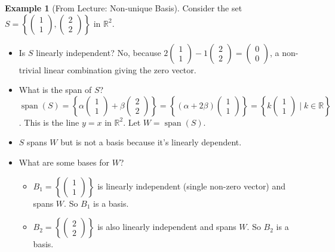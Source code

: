 \documentclass[11pt]{article}
\theoremstyle{definition}
\newtheorem{example}[theorem]{Example}
\theoremstyle{remark}
\newcommand{\R}{\mathbb{R}}
\newcommand{\Span}{\operatorname{span}}
\begin{document}
\begin{example}[From Lecture: Non-unique Basis]
Consider the set $S = \left\{ \begin{pmatrix} 1 \\ 1 \end{pmatrix}, \begin{pmatrix} 2 \\ 2 \end{pmatrix} \right\}$ in $\R^2$.
\begin{itemize}
    \item Is $S$ linearly independent? No, because $2 \begin{pmatrix} 1 \\ 1 \end{pmatrix} - 1 \begin{pmatrix} 2 \\ 2 \end{pmatrix} = \begin{pmatrix} 0 \\ 0 \end{pmatrix}$, a non-trivial linear combination giving the zero vector.
    \item What is the span of $S$? $\Span(S) = \left\{ \alpha \begin{pmatrix} 1 \\ 1 \end{pmatrix} + \beta \begin{pmatrix} 2 \\ 2 \end{pmatrix} \right\} = \left\{ (\alpha + 2\beta) \begin{pmatrix} 1 \\ 1 \end{pmatrix} \right\} = \left\{ k \begin{pmatrix} 1 \\ 1 \end{pmatrix} \mid k \in \R \right\}$. This is the line $y=x$ in $\R^2$. Let $W = \Span(S)$.
    \item $S$ spans $W$ but is not a basis because it's linearly dependent.
    \item What are some bases for $W$?
        \begin{itemize}
            \item $B_1 = \left\{ \begin{pmatrix} 1 \\ 1 \end{pmatrix} \right\}$ is linearly independent (single non-zero vector) and spans $W$. So $B_1$ is a basis.
            \item $B_2 = \left\{ \begin{pmatrix} 2 \\ 2 \end{pmatrix} \right\}$ is also linearly independent and spans $W$. So $B_2$ is a basis.

\end{itemize}
\end{itemize}
\end{example}
\end{document}
